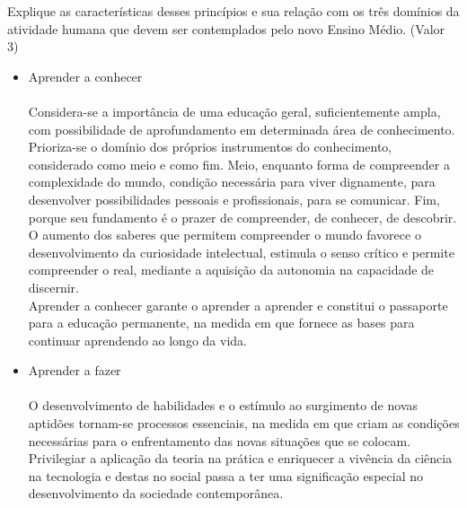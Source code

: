 \documentclass[a4paper, 12pt]{article}
\begin{document}
\begin{enumerate}
  Explique as características desses princípios e sua relação com os três domínios da atividade humana que devem ser contemplados pelo novo Ensino Médio. (Valor 3)
  \begin{itemize}
  \item Aprender a conhecer\\\\
    Considera-se a importância de uma educação geral, suficientemente ampla, com possibilidade de aprofundamento em determinada área de conhecimento. Prioriza-se o domínio dos próprios instrumentos do conhecimento, considerado como meio e como fim. Meio, enquanto forma de compreender a complexidade do mundo, condição necessária para viver dignamente, para desenvolver possibilidades pessoais e profissionais, para se comunicar. Fim, porque seu fundamento é o prazer de compreender, de conhecer, de descobrir.\\
    O aumento dos saberes que permitem compreender o mundo favorece o desenvolvimento da curiosidade intelectual, estimula o senso crítico e permite compreender o real, mediante a aquisição da autonomia na capacidade de discernir.\\
    Aprender a conhecer garante o aprender a aprender e constitui o passaporte para a educação permanente, na medida em que fornece as bases para continuar aprendendo ao longo da vida.
  \item Aprender a fazer\\\\
    O desenvolvimento de habilidades e o estímulo ao surgimento de novas aptidões tornam-se processos essenciais, na medida em que criam as condições necessárias para o enfrentamento das novas situações que se colocam.\\
    Privilegiar a aplicação da teoria na prática e enriquecer a vivência da ciência na tecnologia e destas no social passa a ter uma significação especial no desenvolvimento da sociedade contemporânea.

\end{itemize}
\end{enumerate}
\end{document}
